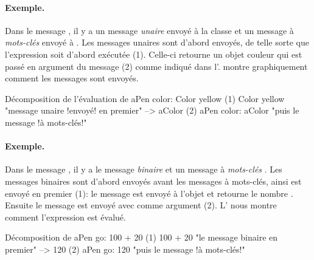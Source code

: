 \documentclass[a4paper,10pt,twoside]{book}
\begin{document}
\paragraph{Exemple.}
Dans le message , il y a un message \emph{unaire}  envoyé à la classe  et un message à \emph{mots-clés}  envoyé à . Les messages unaires sont d'abord envoyés, de telle sorte que l'expression  soit d'abord exécutée (1). Celle-ci retourne un objet couleur qui est passé en argument du message  (2) comme indiqué dans l'.
 montre graphiquement comment les messages sont envoyés.

\begin{example}[decColor]{Décomposition de l'évaluation de }{}
        aPen color: Color yellow
(1)                       Color yellow        "message unaire !envoyé! en premier"
                        --> aColor
(2)   aPen color: aColor                 "puis le message !à mots-clés!"
\end{example}

\paragraph{Exemple.} Dans le message , il y a le message \emph{binaire}  et un message à \emph{mots-clés} . Les messages binaires sont d'abord envoyés avant les messages à mots-clés, ainsi  est envoyé en premier (1): le message  est envoyé à l'objet  et retourne le nombre . Ensuite le message  est envoyé avec comme argument  (2).
L' nous montre comment l'expression est évalué. 

\begin{example}[decGo]{Décomposition de }{}
      aPen go: 100 + 20   
(1)                 100 + 20           "le message binaire en premier"
                   -->   120
(2)  aPen go: 120                   "puis le message !à mots-clés!"
\end{example}
\end{document}
